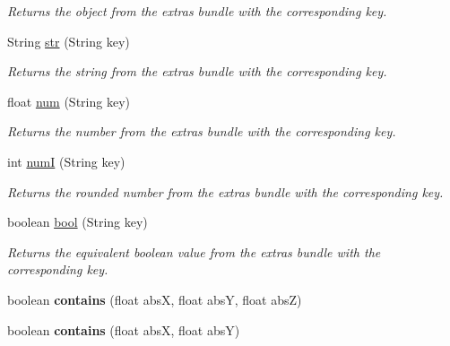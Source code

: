 \begin{DoxyCompactItemize}
\begin{DoxyCompactList}\small\item\em Returns the object from the {\itshape extras bundle} with the corresponding key. \end{DoxyCompactList}\item 
String \hyperlink{classhype_1_1core_1_1drawable_1_1_h_drawable_aeb66f7edfc095b6f827beb6c13caeb6a}{str} (String key)
\begin{DoxyCompactList}\small\item\em Returns the string from the {\itshape extras bundle} with the corresponding key. \end{DoxyCompactList}\item 
float \hyperlink{classhype_1_1core_1_1drawable_1_1_h_drawable_a5f983b4eb6b918b30b8caf1acd5e7f84}{num} (String key)
\begin{DoxyCompactList}\small\item\em Returns the number from the {\itshape extras bundle} with the corresponding key. \end{DoxyCompactList}\item 
int \hyperlink{classhype_1_1core_1_1drawable_1_1_h_drawable_abf2d2f75635975c52449b493af18e696}{num\-I} (String key)
\begin{DoxyCompactList}\small\item\em Returns the rounded number from the {\itshape extras bundle} with the corresponding key. \end{DoxyCompactList}\item 
boolean \hyperlink{classhype_1_1core_1_1drawable_1_1_h_drawable_a05b3317714513026e65a83cd7820f49b}{bool} (String key)
\begin{DoxyCompactList}\small\item\em Returns the equivalent boolean value from the {\itshape extras bundle} with the corresponding key. \end{DoxyCompactList}\item 
\hypertarget{classhype_1_1core_1_1drawable_1_1_h_drawable_a38c86d2f7ddaba669808f0f3299f5205}{boolean {\bfseries contains} (float abs\-X, float abs\-Y, float abs\-Z)}\label{classhype_1_1core_1_1drawable_1_1_h_drawable_a38c86d2f7ddaba669808f0f3299f5205}

\item 
\hypertarget{classhype_1_1core_1_1drawable_1_1_h_drawable_ab71889d2e71d68c841d869c81c4d9413}{boolean {\bfseries contains} (float abs\-X, float abs\-Y)}\label{classhype_1_1core_1_1drawable_1_1_h_drawable_ab71889d2e71d68c841d869c81c4d9413}


\end{DoxyCompactItemize}
